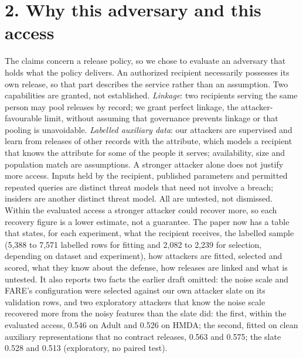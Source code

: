 \documentclass[10pt]{article}
\begin{document}
\section*{2. Why this adversary and this access}
The claims concern a release policy, so we chose to evaluate an adversary that holds what the policy delivers. An
authorized recipient necessarily possesses its own release, so that part describes the service rather than an
assumption. Two capabilities are granted, not
established. \emph{Linkage}: two recipients serving the same person may pool releases by record; we grant perfect
linkage, the attacker-favourable limit, without assuming that governance prevents linkage or that pooling is
unavoidable. \emph{Labelled auxiliary data}: our attackers are supervised and learn from releases of other records with
the attribute, which models a recipient that knows the attribute for some of the people it serves; availability, size
and population match are assumptions. A stronger attacker alone does not justify more access. Inputs held by the
recipient, published parameters and permitted repeated queries are distinct threat models that need not involve a
breach; insiders are another distinct threat model. All are untested, not dismissed. Within the evaluated access a
stronger attacker could recover more, so each recovery figure is a lower estimate, not a guarantee. The paper now has a table that states, for each experiment, what the recipient
receives, the labelled sample (5{,}388 to 7{,}571 labelled rows for fitting and 2{,}082 to 2{,}239 for selection,
depending on dataset and experiment), how attackers are fitted, selected and scored, what they know about the defense, how releases are linked
and what is untested. It also reports two facts the earlier draft omitted: the noise scale and FARE's configuration
were selected against our own attacker slate on its validation rows, and two exploratory attackers that know the noise
scale recovered more from the noisy features than the slate did: the first, within the evaluated access, 0.546 on Adult
and 0.526 on HMDA; the second, fitted on clean auxiliary representations that no contract releases, 0.563 and 0.575;
the slate 0.528 and 0.513 (exploratory, no paired test).
\end{document}
